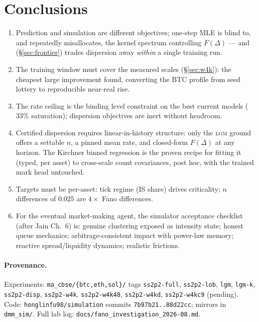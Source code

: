 \documentclass[11pt]{article}
\newcommand{\lgm}{\textsc{lgm}}
\newcommand{\Fano}{F}
\begin{document}
\section{Conclusions}
\begin{enumerate}
\item Prediction and simulation are different objectives; one-step MLE is
  blind to, and repeatedly misallocates, the kernel spectrum controlling
  $\Fano(\Delta)$ --- and (\S\ref{sec:frontier}) trades dispersion away
  \emph{within} a single training run.
\item The training window must cover the measured scales
  (\S\ref{sec:w4k}): the cheapest large improvement found, converting the
  BTC profile from seed lottery to reproducible near-real rise.
\item The rate ceiling is the binding level constraint on the best current
  models ($33\%$ saturation); dispersion objectives are inert without
  headroom.
\item Certified dispersion requires linear-in-history structure: only the
  \lgm{} ground offers a settable $n$, a pinned mean rate, and closed-form
  $\Fano(\Delta)$ at any horizon. The Kirchner binned regression is the
  proven recipe for fitting it (typed, per asset) to cross-scale count
  covariances, post hoc, with the trained mark head untouched.
\item Targets must be per-asset: tick regime (IS share) drives criticality;
  $n$ differences of $0.025$ are $4\times$ Fano differences.
\item For the eventual market-making agent, the simulator acceptance
  checklist (after Jain Ch.~6) is: genuine clustering exposed as intensity
  state; honest queue mechanics; arbitrage-consistent impact with power-law
  memory; reactive spread/liquidity dynamics; realistic frictions.
\end{enumerate}

\paragraph{Provenance.} Experiments:
\texttt{ma\_cbse/\{btc,eth,sol\}/} tags \texttt{ss2p2-full},
\texttt{ss2p2-lob}, \texttt{lgm}, \texttt{lgm-k}, \texttt{ss2p2-disp},
\texttt{ss2p2-w4k}, \texttt{ss2p2-w4k48}, \texttt{ss2p2-w4kd},
\texttt{ss2p2-w4kc9} (pending). Code: \texttt{honglinfu98/simulation}
commits \texttt{7b97b21..88d22cc}; mirrors in \texttt{dmm\_sim/}. Full lab
log: \texttt{docs/fano\_investigation\_2026-08.md}.
\end{document}
